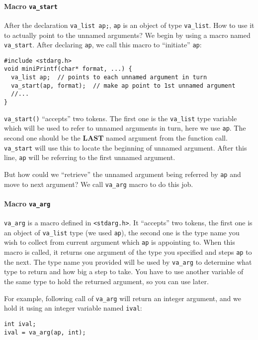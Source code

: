 \documentclass[11pt]{article}
\begin{document}
\paragraph{Macro \texttt{va\_start}}
\label{sec:org87a0ff6}
After the declaration \texttt{va\_list ap;}, \texttt{ap} is an object of type \texttt{va\_list}. How to use it to actually point to the unnamed arguments? We begin by using a macro named \texttt{va\_start}. After declaring \texttt{ap}, we call this macro to ``initiate'' \texttt{ap}:
\begin{verbatim}
#include <stdarg.h>
void miniPrintf(char* format, ...) {
  va_list ap;  // points to each unnamed argument in turn
  va_start(ap, format);  // make ap point to 1st unnamed argument
  //...
}
\end{verbatim}
\texttt{va\_start()} ``accepts'' two tokens. The first one is the \texttt{va\_list} type variable which will be used to refer to unnamed arguments in turn, here we use \texttt{ap}. The second one should be the \textbf{LAST} named argument from the function call. \texttt{va\_start} will use this to locate the beginning of unnamed argument. After this line, \texttt{ap} will be referring to the first unnamed argument.

But how could we ``retrieve'' the unnamed argument being referred by \texttt{ap} and move to next argument? We call \texttt{va\_arg} macro to do this job.

\paragraph{Macro \texttt{va\_arg}}
\label{sec:org97f22a7}
\texttt{va\_arg} is a macro defined in \texttt{<stdarg.h>}. It ``accepts'' two tokens, the first one is an object of \texttt{va\_list} type (we used \texttt{ap}), the second one is the type name you wish to collect from current argument which \texttt{ap} is appointing to. When this macro is called, it returns one argument of the type you specified and steps \texttt{ap} to the next. The type name you provided will be used by \texttt{va\_arg} to determine what type to return and how big a step to take. You have to use another variable of the same type to hold the returned argument, so you can use later.

For example, following call of \texttt{va\_arg} will return an integer argument, and we hold it using an integer variable named \texttt{ival}:
\begin{verbatim}
int ival;
ival = va_arg(ap, int);
\end{verbatim}
\end{document}
